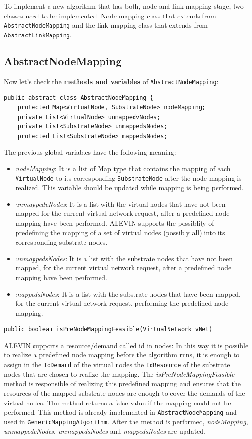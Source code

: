 To implement a new algorithm that has both,
node and link mapping stage, two classes need to be implemented. 
Node mapping class that extends from \texttt{AbstractNodeMapping} and the link mapping class that extends from \texttt{AbstractLinkMapping}.


\subsection{AbstractNodeMapping}
Now let's check the \textbf{methods and variables} of \texttt{AbstractNodeMapping}:
\begin{lstlisting}
public abstract class AbstractNodeMapping {
	protected Map<VirtualNode, SubstrateNode> nodeMapping;
	private List<VirtualNode> unmappedvNodes;
	private List<SubstrateNode> unmappedsNodes;
	protected List<SubstrateNode> mappedsNodes;
\end{lstlisting}
The previous global variables have the following meaning:
\begin{itemize}
	\item \textsl{nodeMapping}: It is a list of Map type that contains the mapping of each \texttt{VirtualNode} 
	to its corresponding \texttt{SubstrateNode} after the node mapping is realized. 
	This variable should be updated while mapping is being performed.
	\item \textsl{unmappedvNodes}: It is a list with the virtual nodes that have not been mapped for the current virtual network request, after a predefined node mapping have been performed. ALEVIN supports the possiblity of predefining the mapping of a set of virtual nodes (possibly all) into its corresponding substrate nodes.
	\item \textsl{unmappedsNodes}: It is a list with the substrate nodes that have not been mapped, for the current virtual network request, after a predefined node mapping have been performed.
	\item \textsl{mappedsNodes}: It is a list with the substrate nodes that have been mapped, for the current virtual network request, performing the predefined node mapping.
\end{itemize}



\begin{lstlisting}
public boolean isPreNodeMappingFeasible(VirtualNetwork vNet)
\end{lstlisting}
ALEVIN supports a resource/demand called id in nodes: 
In this way it is possible to realize a predefined node mapping before the algorithm runs, it is enough to assign in the \texttt{IdDemand} of the virtual nodes the \texttt{IdResource} of the substrate nodes that are chosen to realize the mapping. 
The \textsl{isPreNodeMappingFeasible} method is responsible of realizing this predefined mapping and ensures that the resources of the mapped substrate nodes are enough to cover the demands of the virtual nodes. 
The method returns a false value if the mapping could not be performed. 
This method is already implemented in \texttt{AbstractNodeMapping} and used in \texttt{GenericMappingAlgorithm}. 
After the method is performed, \textsl{nodeMapping}, \textsl{unmappedvNodes}, \textsl{unmappedsNodes} and \textsl{mappedsNodes} are updated.



